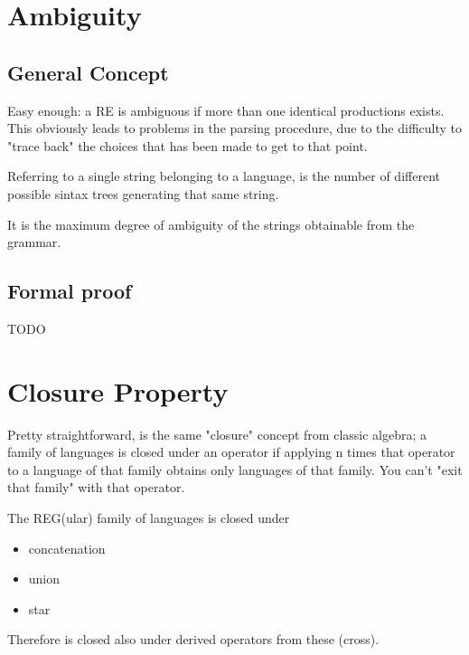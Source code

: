     \section{Ambiguity}
        \subsection{General Concept}
        Easy enough: a RE is ambiguous if more than one identical productions exists. This obviously leads to problems in the parsing procedure, due to the difficulty 
        to "trace back" the choices that has been made to get to that point. 
        \begin{definition}
            Referring to a single string belonging to a language, is the number of different possible sintax trees generating that same string.
        \end{definition}
        \begin{definition}
            It is the maximum degree of ambiguity of the strings obtainable from the grammar.
        \end{definition}
        \subsection{Formal proof}\label{sect:formalproofambiguity}
            TODO%

    \section{Closure Property}
        Pretty straightforward, is the same "closure" concept from classic algebra; a family of languages is closed under an operator if applying n times that 
        operator to a language of that family obtains only languages of that family. You can't "exit that family" with that operator.
        
        The REG(ular) family of languages is closed under
        \begin{itemize}
            \item concatenation
            \item union
            \item star
        \end{itemize}
        Therefore is closed also under derived operators from these (cross).
